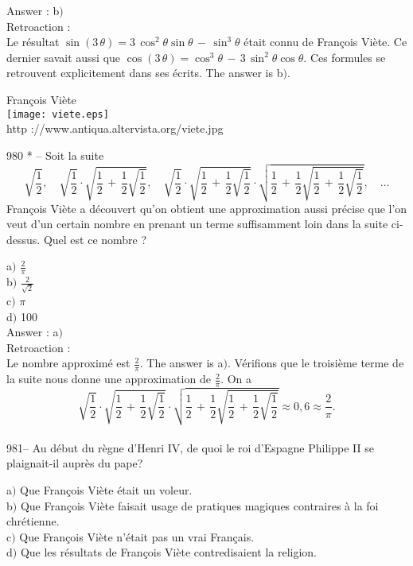 ﻿\documentclass[letterpaper, 12pt]{article}
\begin{document}
Answer : b$)$\\

Retroaction : \\
Le r\'esultat
$\sin(3\,\theta)=3\,\cos^2\theta\sin\theta\,-\,\sin^3\theta$ \'etait
connu de Fran\c cois Vi\`ete. Ce dernier savait aussi que
$\cos(3\,\theta)=\cos^3\theta\,-\,3\,\sin^2\theta\cos\theta$. Ces
formules se retrouvent explicitement dans ses \'ecrits.
The answer is b$)$.\\

        \begin{center}
        Fran\c cois Vi\`ete\\
    \texttt{[image: viete.eps]}\\
        {\footnotesize http ://www.antiqua.altervista.org/viete.jpg}
    \end{center}

980 * -- Soit la suite
$$\displaystyle\sqrt{\frac12},\quad\displaystyle\sqrt{\frac12}\cdot\displaystyle\sqrt{\frac12\,+\,\frac12\sqrt{\frac12}},\quad
\displaystyle\sqrt{\frac12}\cdot\displaystyle\sqrt{\frac12\,+\,\frac12\sqrt{\frac12}}\cdot
\displaystyle\sqrt{\frac12\,+\,\frac12\sqrt{\frac12\,+\,\frac12\sqrt{\frac12}}},\quad\ldots$$
Fran\c cois Vi\`ete a d\'ecouvert qu'on obtient une approximation
aussi pr\'ecise que l'on veut d'un certain nombre en prenant un
terme suffisamment loin dans la suite ci-dessus. Quel est ce nombre
?

a$)$ $\frac2{\pi}$\\
b$)$ $\frac2{\sqrt2}$ \\
c$)$ $\pi$ \\
d$)$ 100\\

Answer : a$)$\\

Retroaction : \\
Le nombre approxim\'e est $\frac2{\pi}$. The answer is a$)$.
V\'erifions que le troisi\`eme terme de la suite nous donne une
approximation de $\frac{2}{\pi}$. On a
$$\displaystyle\sqrt{\frac12}\cdot\displaystyle\sqrt{\frac12\,+\,\frac12\sqrt{\frac12}}\cdot
\displaystyle\sqrt{\frac12\,+\,\frac12\sqrt{\frac12\,+\,\frac12\sqrt{\frac12}}}\approx0,6\approx\frac2{\pi}.$$
\\

981-- Au d\'ebut du r\`egne d'Henri IV, de quoi le roi d'Espagne
Philippe II se plaignait-il aupr\`es du pape?

a$)$ Que Fran\c cois Vi\`ete \'etait un voleur. \\
b$)$ Que Fran\c cois Vi\`ete faisait usage de pratiques magiques contraires
\`a la foi chr\'etienne. \\
c$)$ Que Fran\c cois Vi\`ete n'\'etait pas un vrai Fran\c cais. \\
d$)$ Que les r\'esultats de Fran\c cois Vi\`ete contredisaient la
religion.\\
\end{document}
